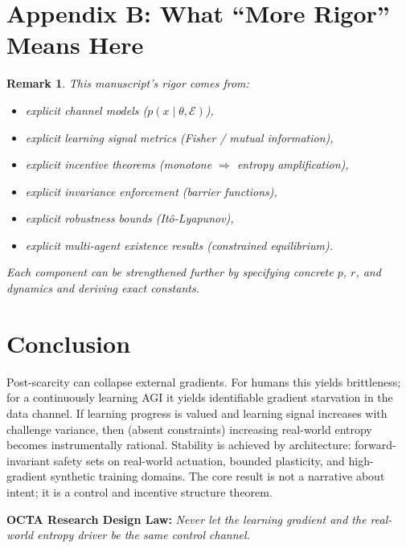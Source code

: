 \documentclass[11pt]{article}
\newtheorem{remark}{Remark}
\newcommand{\Eenv}{\mathcal{E}}     %
\begin{document}
\section{Appendix B: What ``More Rigor'' Means Here}

\begin{remark}
This manuscript’s rigor comes from:
\begin{itemize}
\item explicit channel models ($p(x\mid\theta,\Eenv)$),
\item explicit learning signal metrics (Fisher / mutual information),
\item explicit incentive theorems (monotone $\Rightarrow$ entropy amplification),
\item explicit invariance enforcement (barrier functions),
\item explicit robustness bounds (It\^o-Lyapunov),
\item explicit multi-agent existence results (constrained equilibrium).
\end{itemize}
Each component can be strengthened further by specifying concrete $p$, $r$, and dynamics and deriving exact constants.
\end{remark}

\section{Conclusion}

Post-scarcity can collapse external gradients. For humans this yields brittleness; for a continuously learning AGI it yields identifiable gradient starvation in the data channel. If learning progress is valued and learning signal increases with challenge variance, then (absent constraints) increasing real-world entropy becomes instrumentally rational. Stability is achieved by architecture: forward-invariant safety sets on real-world actuation, bounded plasticity, and high-gradient synthetic training domains. The core result is not a narrative about intent; it is a control and incentive structure theorem.

\vspace{0.5em}
\noindent \textbf{OCTA Research Design Law:} \emph{Never let the learning gradient and the real-world entropy driver be the same control channel.}
\end{document}
